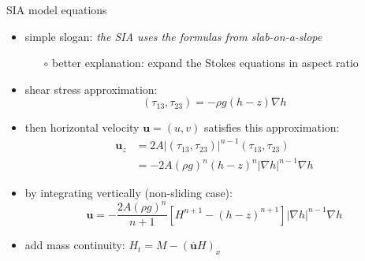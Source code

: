 \begin{frame}{SIA model equations}

\begin{itemize}
\item simple slogan: \emph{the SIA uses the formulas from slab-on-a-slope}
  \begin{itemize}
  \item[$\circ$] better explanation: expand the Stokes equations in aspect ratio
  \end{itemize}

\item shear stress approximation:
	$$(\tau_{13},\tau_{23}) = - \rho g (h-z) \nabla h$$
\item then horizontal velocity $\mathbf{u} = (u,v)$ satisfies this approximation:
\begin{align*}
\mathbf{u}_z &= 2 A |(\tau_{13},\tau_{23})|^{n-1} (\tau_{13},\tau_{23}) \\
     &= - 2 A (\rho g)^n (h-z)^n |\nabla h|^{n-1} \nabla h
\end{align*}
\item by integrating vertically (non-sliding case):
    $$\mathbf{u} = - \frac{2 A (\rho g)^n}{n+1} \left[H^{n+1} - (h-z)^{n+1}\right] |\nabla h|^{n-1} \nabla h$$
\item add mass continuity: \quad $H_t = M - \left(\overline{\mathbf{u}} H\right)_x$
\end{itemize}
\end{frame}


